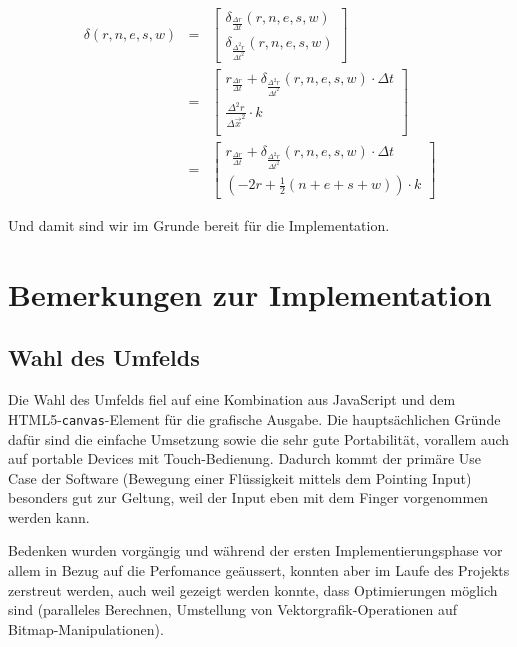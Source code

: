 \documentclass[11pt]{scrreprt} %
\theoremstyle{definition}
\begin{document}
\begin{eqnarray*}
\delta(r, n, e, s, w) &=& \begin{bmatrix}
	\delta_{\frac {\Delta r}{\Delta t}}(r,n,e,s,w) \\
	\delta_{\frac {\Delta^2 r}{\Delta t^2}}(r,n,e,s,w)
\end{bmatrix} \\
&=& \begin{bmatrix}
	r_{\frac {\Delta r}{\Delta t}} + \delta_{\frac {\Delta^2 r}{\Delta t^2}}(r,n,e,s,w)  \cdot \Delta t \\
	\frac{\Delta^2 r}{\Delta \vec x^2} \cdot k  \\
\end{bmatrix} \\
&=& \begin{bmatrix}
	r_{\frac {\Delta r}{\Delta t}} + \delta_{\frac {\Delta^2 r}{\Delta t^2}}(r,n,e,s,w)  \cdot \Delta t \\
	(-2 r + \frac 1 2 (n + e + s + w)) \cdot k
\end{bmatrix}
\end{eqnarray*}

Und damit sind wir im Grunde bereit für die Implementation.

\chapter{Bemerkungen zur Implementation}

\section{Wahl des Umfelds}

Die Wahl des Umfelds fiel auf eine Kombination aus JavaScript und dem HTML5-{\tt canvas}-Element für die grafische Ausgabe. Die hauptsächlichen Gründe dafür sind die einfache Umsetzung sowie die sehr gute Portabilität, vorallem auch auf portable Devices mit Touch-Bedienung. Dadurch kommt der primäre Use Case der Software (Bewegung einer Flüssigkeit mittels dem Pointing Input) besonders gut zur Geltung, weil der Input eben mit dem Finger vorgenommen werden kann.

Bedenken wurden vorgängig und während der ersten Implementierungsphase vor allem in Bezug auf die Perfomance geäussert, konnten aber im Laufe des Projekts zerstreut werden, auch weil gezeigt werden konnte, dass Optimierungen möglich sind (paralleles Berechnen, Umstellung von Vektorgrafik-Operationen auf Bitmap-Manipulationen).
\end{document}

